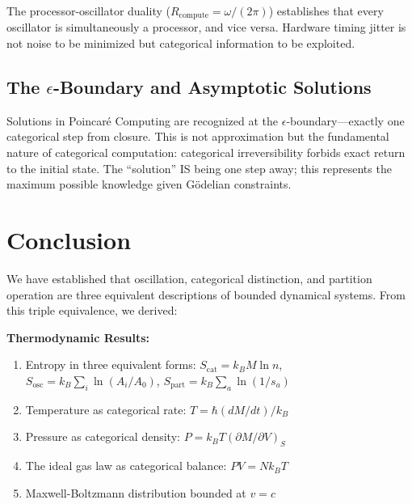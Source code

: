 The processor-oscillator duality ($R_{\text{compute}} = \omega/(2\pi)$) establishes that every oscillator is simultaneously a processor, and vice versa. Hardware timing jitter is not noise to be minimized but categorical information to be exploited.

\subsection{The $\epsilon$-Boundary and Asymptotic Solutions}

Solutions in Poincar\'e Computing are recognized at the $\epsilon$-boundary---exactly one categorical step from closure. This is not approximation but the fundamental nature of categorical computation: categorical irreversibility forbids exact return to the initial state. The ``solution'' IS being one step away; this represents the maximum possible knowledge given G\"odelian constraints.

\section{Conclusion}
\label{sec:conclusion}

We have established that oscillation, categorical distinction, and partition operation are three equivalent descriptions of bounded dynamical systems. From this triple equivalence, we derived:

\textbf{Thermodynamic Results:}
\begin{enumerate}
    \item Entropy in three equivalent forms: $S_{\text{cat}} = k_B M \ln n$, $S_{\text{osc}} = k_B \sum_i \ln(A_i/A_0)$, $S_{\text{part}} = k_B \sum_a \ln(1/s_a)$
    \item Temperature as categorical rate: $T = \hbar(dM/dt)/k_B$
    \item Pressure as categorical density: $P = k_BT(\partial M/\partial V)_S$
    \item The ideal gas law as categorical balance: $PV = Nk_BT$
    \item Maxwell-Boltzmann distribution bounded at $v = c$
\end{enumerate}

